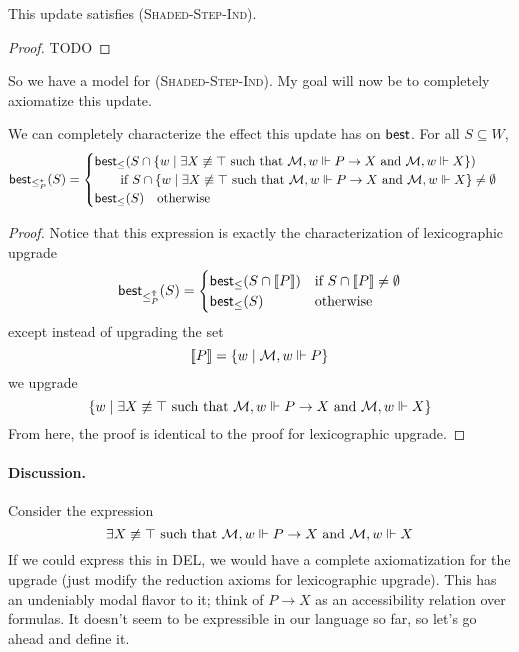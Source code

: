 \documentclass[letterpaper]{article}
\begin{document}
\begin{theorem}
    This update satisfies \textsc{(Shaded-Step-Ind)}.
\end{theorem}
\begin{proof}
    TODO
\end{proof}

So we have a model for \textsc{(Shaded-Step-Ind)}. My goal will now be to completely axiomatize this update.

\begin{proposition}
    We can completely characterize the effect this update has on $\mathsf{best}$.  For all $S \subseteq W$,
    \[
        \mathsf{best}_{\leq^\star_P}(S) =
        \begin{cases}
             \mathsf{best}_\leq(S \cap \{ w \mid \exists X\not\equiv\top \mbox{ such that } \mathcal{M}, w \Vdash P \to X \mbox{ and } \mathcal{M}, w \Vdash X \})\\
             \quad \quad \mbox{if } S \cap \{ w \mid \exists X\not\equiv\top \mbox{ such that } \mathcal{M}, w \Vdash P \to X \mbox{ and } \mathcal{M}, w \Vdash X \} \ne \emptyset\\
            \mathsf{best}_\leq(S) \quad \mbox{otherwise}
        \end{cases}
    \]
\end{proposition}
\begin{proof}
    Notice that this expression is exactly the characterization of lexicographic upgrade
    \[  \mathsf{best}_{\leq^\Uparrow_P}(S) = 
        \begin{cases}
            \mathsf{best}_\leq(S \cap [\![\mbox{\em $ P $\/}]\!]) & \mbox{if } S \cap [\![\mbox{\em $ P $\/}]\!] \ne \emptyset\\
            \mathsf{best}_\leq(S) & \mbox{otherwise}
        \end{cases}
    \]
    except instead of upgrading the set
    \[
        [\![\mbox{\em $ P $\/}]\!] = \{ w \mid \mathcal{M}, w \Vdash P \}
    \]
    we upgrade
    \[
        \{ w \mid \exists X\not\equiv\top \mbox{ such that } \mathcal{M}, w \Vdash P \to X \mbox{ and } \mathcal{M}, w \Vdash X \}
    \]
    From here, the proof is identical to the proof for lexicographic upgrade.
\end{proof}

\paragraph*{Discussion.} Consider the expression
\[
    \exists X\not\equiv\top \mbox{ such that } \mathcal{M}, w \Vdash P \to X \mbox{ and } \mathcal{M}, w \Vdash X
\]
If we could express this in DEL, we would have a complete axiomatization for the upgrade (just modify the reduction axioms for lexicographic upgrade).  This has an undeniably modal flavor to it; think of $P \to X$ as an accessibility relation over formulas.  It doesn't seem to be expressible in our language so far, so let's go ahead and define it.
\end{document}
